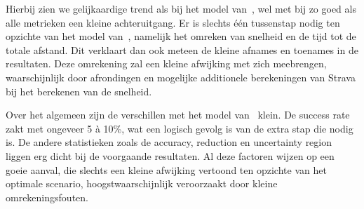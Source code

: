 Hierbij zien we gelijkaardige trend als bij het model van~\citeauthor{Dhondt},
wel met bij zo goed als alle metrieken een kleine achteruitgang. Er is slechts
één tussenstap nodig ten opzichte van het model van~\citeauthor{Dhondt},
namelijk het omreken van snelheid en de tijd tot de totale afstand. Dit
verklaart dan ook meteen de kleine afnames en toenames in de resultaten. Deze
omrekening zal een kleine afwijking met zich meebrengen, waarschijnlijk door
afrondingen en mogelijke additionele berekeningen van Strava bij het berekenen
van de snelheid.

Over het algemeen zijn de verschillen met het model van~\citeauthor{Dhondt}
klein. De success rate zakt met ongeveer 5 à 10\%, wat een logisch gevolg is
van de extra stap die nodig is. De andere statistieken zoals de accuracy,
reduction en uncertainty region liggen erg dicht bij de voorgaande resultaten.
Al deze factoren wijzen op een goeie aanval, die slechts een kleine afwijking
vertoond ten opzichte van het optimale scenario, hoogstwaarschijnlijk
veroorzaakt door kleine omrekeningsfouten.

